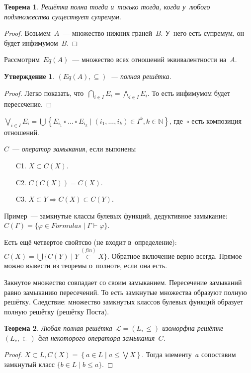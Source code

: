 \documentclass{article}
\newtheorem{theorem}{Теорема}
\newtheorem{claim}{Утверждение}
\renewcommand{\le}{\leqslant}
\renewcommand{\phi}{\varphi}
\begin{document}
\begin{theorem}
  Решётка полна тогда и~только тогда, когда у~любого подмножества существует
  супремум.
\end{theorem}
\begin{proof}
  Возьмем~$A$~--- множество нижних граней~$B$. У~него есть супремум, он будет
  инфимумом~$B$.
\end{proof}

Рассмотрим~$Eq(A)$~--- множество всех отношений эквивалентности на~$A$.

\begin{claim}
  $(Eq(A), \subseteq)$~--- полная решётка.
\end{claim}
\begin{proof}
  Легко показать, что~$\bigcap\limits_{i\in I}E_i = \bigwedge\limits_{i\in
  I}E_i$. То есть инфимумом будет пересечение.
\end{proof}

$\bigvee\limits_{i \in I}E_i = \bigcup \left\{ E_{i_1} \circ \ldots \circ
E_{i_k} \mid \left(i_1, \ldots, i_k\right) \in I^k, k \in \mathbb{N}
\right\}$, где~$\circ$ есть композиция отношений.

$C$~--- \emph{оператор замыкания}, если выпонены
\begin{itemize}
  \item[C1.] $X \subset C(X)$.
  \item[C2.] $C(C(X)) = C(X)$.
  \item[C3.] $X \subset Y \Rightarrow C(X) \subset C(Y)$.
\end{itemize}

Пример~--- замкнутые классы булевых функций, дедуктивное замыкание: $C(\Gamma) =
\{ \phi \in Formulas \mid \Gamma \vdash \phi\}$.

Есть ещё четвертое свойтсво (не входит в~определение): $C(X) = \bigcup\{C(Y)
\mid Y \overset{(fin)}\subset X\}$. Обратное включение верно всегда. Прямое
можно вывести из теоремы о~полноте, если она есть.

Закнутое множество совпадает со своим замыканием. Пересечение замыканий равно
замыканию пересечений. То есть замкнутые множества образуют полную решётку.
Следствие: множество замкнутых классов булевых функций образует полную решётку
(решётку Поста).

\begin{theorem}
  Любая полная решётка~$\mathcal{L} = (L, \le)$ изоморфна решётке~$(L_c,
  \subset)$ для некоторого оператора замыкания~$C$.
\end{theorem}
\begin{proof}
  $X \subset L, C(X) = \left\{ a \in L \mid a \le \bigvee X \right\}$. Тогда
  элементу~$a$ сопоставим замкнутый класс $\{b \in L \mid b \le a\}$.
\end{proof}
\end{document}
